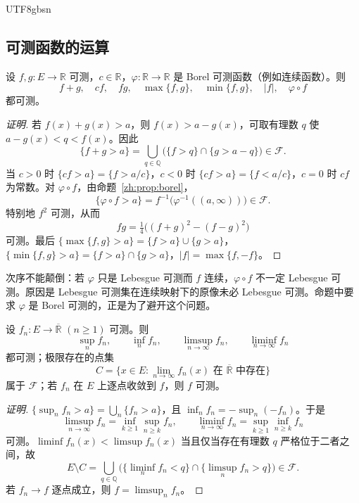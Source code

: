 \documentclass[11pt]{article}
\makeatletter
\newcommand{\envlabel}[1]{\protected@edef\@currentlabel{\themathenv}\label{#1}}
\makeatother
\begin{document}
\begin{CJK*}{UTF8}{gbsn}
\subsection{可测函数的运算}

\begin{proposition}\envlabel{zh:prop:alg}
设 $f,g:E\to\mathbb{R}$ 可测，$c\in\mathbb{R}$，$\varphi:\mathbb{R}\to\mathbb{R}$ 是 Borel 可测函数（例如连续函数）。则
\[
f+g,\quad cf,\quad fg,\quad \max\{f,g\},\quad \min\{f,g\},\quad |f|,\quad \varphi\circ f
\]
都可测。
\end{proposition}

\begin{proof}[证明]
若 $f(x)+g(x)>a$，则 $f(x)>a-g(x)$，可取有理数 $q$ 使 $a-g(x)<q<f(x)$。因此
\[
\{f+g>a\}=\bigcup_{q\in\mathbb{Q}}\big(\{f>q\}\cap\{g>a-q\}\big)\in\mathcal{F}.
\]
当 $c>0$ 时 $\{cf>a\}=\{f>a/c\}$，$c<0$ 时 $\{cf>a\}=\{f<a/c\}$，$c=0$ 时 $cf$ 为常数。对 $\varphi\circ f$，由命题~\ref{zh:prop:borel}，
\[
\{\varphi\circ f>a\}=f^{-1}\big(\varphi^{-1}((a,\infty))\big)\in\mathcal{F}.
\]
特别地 $f^{2}$ 可测，从而
\[
fg=\tfrac14\big((f+g)^{2}-(f-g)^{2}\big)
\]
可测。最后 $\{\max\{f,g\}>a\}=\{f>a\}\cup\{g>a\}$，$\{\min\{f,g\}>a\}=\{f>a\}\cap\{g>a\}$，$|f|=\max\{f,-f\}$。
\end{proof}

\begin{remark}
次序不能颠倒：若 $\varphi$ 只是 Lebesgue 可测而 $f$ 连续，$\varphi\circ f$ 不一定 Lebesgue 可测。原因是 Lebesgue 可测集在连续映射下的原像未必 Lebesgue 可测。命题中要求 $\varphi$ 是 Borel 可测的，正是为了避开这个问题。
\end{remark}

\begin{proposition}\envlabel{zh:prop:limits}
设 $f_{n}:E\to\overline{\mathbb{R}}$ $(n\geq1)$ 可测。则
\[
\sup_{n}f_{n},\qquad\inf_{n}f_{n},\qquad\limsup_{n\to\infty}f_{n},\qquad\liminf_{n\to\infty}f_{n}
\]
都可测；极限存在的点集
\[
C=\Big\{x\in E:\lim_{n\to\infty}f_{n}(x)\text{ 在 }\overline{\mathbb{R}}\text{ 中存在}\Big\}
\]
属于 $\mathcal{F}$；若 $f_{n}$ 在 $E$ 上逐点收敛到 $f$，则 $f$ 可测。
\end{proposition}

\begin{proof}[证明]
$\{\sup_{n}f_{n}>a\}=\bigcup_{n}\{f_{n}>a\}$，且 $\inf_{n}f_{n}=-\sup_{n}(-f_{n})$。于是
\[
\limsup_{n\to\infty}f_{n}=\inf_{k\geq1}\sup_{n\geq k}f_{n},\qquad \liminf_{n\to\infty}f_{n}=\sup_{k\geq1}\inf_{n\geq k}f_{n}
\]
可测。$\liminf f_{n}(x)<\limsup f_{n}(x)$ 当且仅当存在有理数 $q$ 严格位于二者之间，故
\[
E\setminus C=\bigcup_{q\in\mathbb{Q}}\Big(\big\{\liminf_{n}f_{n}<q\big\}\cap\big\{\limsup_{n}f_{n}>q\big\}\Big)\in\mathcal{F}.
\]
若 $f_{n}\to f$ 逐点成立，则 $f=\limsup_{n}f_{n}$。
\end{proof}


\end{CJK*}
\end{document}
